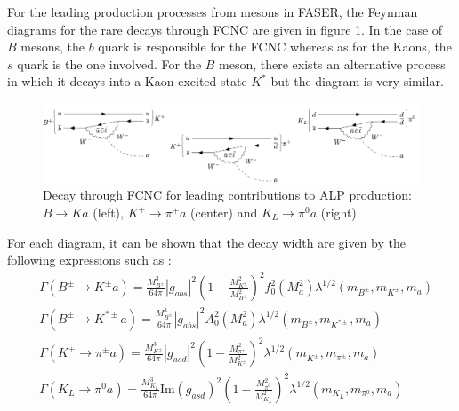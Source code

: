 		For the leading production processes from mesons in FASER, the Feynman diagrams for the rare decays through FCNC are given in figure \ref{im:meson_decay_FCNC}. In the case of $B$ mesons, the $b$ quark is responsible for the FCNC whereas as for the Kaons, the $s$ quark is the one involved. For the $B$ meson, there exists an alternative process in which it decays into a Kaon excited state $K^*$ but the diagram is very similar. 
		\clearpage
		\begin{figure}[h]
			\centering
			\includegraphics[width=1.0\linewidth]{files/meson_decay_FCNC}
			\caption{Decay through FCNC for leading contributions to ALP production: $B \rightarrow K a$ (left), $K^+ \rightarrow \pi^+ a$ (center) and $K_L \rightarrow \pi^0 a$ (right).}
			\label{im:meson_decay_FCNC}
		\end{figure}
		
		For each diagram, it can be shown that the decay width are given by the following expressions such as \cite{ALPs_general}: 
		\begin{equation}
			\begin{split}
				&\Gamma(B^\pm \rightarrow K^\pm a) = \frac{M_{B^\pm}^3}{64 \pi} \left| g_{abs} \right|^2 \left( 1- \frac{M_{K^\pm}^2}{M_{B^\pm}^2} \right)^2 f_0^2(M_a^2) \lambda^{1/2}(m_{B^\pm}, m_{K^\pm}, m_a) \\
				&\Gamma(B^\pm \rightarrow K^{*\pm} a) = \frac{M_{B^\pm}^3}{64 \pi} \left| g_{abs} \right|^2 A_0^2(M_a^2) \lambda^{1/2}(m_{B^\pm}, m_{K^{*\pm}},m_a) \\
				&\Gamma(K^\pm \rightarrow \pi^\pm a) = \frac{M_{K^\pm}^3}{64 \pi} \left| g_{asd} \right|^2 \left( 1- \frac{M_{\pi^\pm}^2}{M_{K^{\pm}}^2} \right)^2 \lambda^{1/2}(m_{K^\pm}, m_{\pi^\pm}, m_a) \\
				&\Gamma(K_L \rightarrow \pi^0 a) = \frac{M_{K_L}^3}{64 \pi} \text{Im}\left( g_{asd} \right)^2 \left( 1- \frac{M_{\pi^0}^2}{M_{K_L}^2} \right)^2 \lambda^{1/2}(m_{K_L}, m_{\pi^0}, m_a)
			\end{split}
		\end{equation}
		
